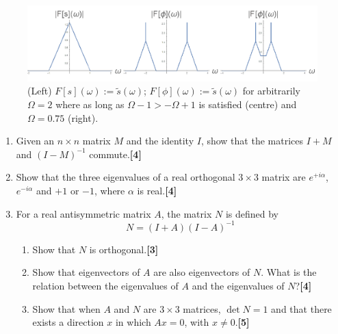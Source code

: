 \documentclass[a4paper]{article}
\begin{document}
\begin{ans}
\begin{enumerate}[label=(\alph*)]
\begin{eqnarray}
\end{eqnarray}
\begin{figure}[H]
    \centering
    \includegraphics[width=\linewidth]{2016P1Q4.PNG}
    \caption{(Left) $F[s](\omega):=\tilde{s}(\omega)$;  $F[\phi](\omega):=\tilde{s}(\omega)$ for arbitrarily $\Omega=2$ where as long as $\Omega-1>-\Omega+1$ is satisfied (centre) and $\Omega=0.75$ (right).}
\end{figure}
\end{enumerate}
\end{ans}
\begin{qns}\leavevmode
\begin{enumerate}[label=(\alph*)]
\item Given an $n \times n$ matrix $M$ and the identity $I$, show that the matrices $I +M$ and $(I −M)^{−1}$ commute.\hfill\textbf{[4]}
\item Show that the three eigenvalues of a real orthogonal $3\times3$ matrix are $e^{+i\alpha}$, $e^{-i\alpha}$ and $+1$ or $−1$, where $\alpha$ is real.\hfill\textbf{[4]}
\item For a real antisymmetric matrix $A$, the matrix $N$ is defined by
$$N=(I+A)(I-A)^{-1}$$
\begin{enumerate}[label=(\roman*)]
\item Show that $N$ is orthogonal.\hfill\textbf{[3]}
\item Show that eigenvectors of $A$ are also eigenvectors of $N$. What is the relation between the eigenvalues of $A$ and the eigenvalues of $N$?\hfill\textbf{[4]}
\item Show that when $A$ and $N$ are $3\times3$ matrices, $\det N = 1$ and that there exists a direction $x$ in which $Ax = 0$, with $x\neq 0$.\hfill\textbf{[5]}
\end{enumerate}
\end{enumerate}
\end{qns}
\end{document}
